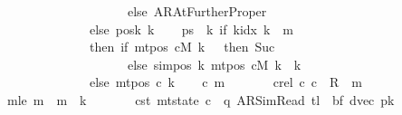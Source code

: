 \begin{isabellebody}
\ \ \ \ \ \ \ \ \ \ \ \ \ \ \ \ \ \ \ \ \ \ \ \ else\ AR{\isacharunderscore}{\kern0pt}AtFurtherProper{\isacharparenright}{\kern0pt}\isanewline
\ \ \ \ \ \ \ \ \ \ \ \ \ \ \ \ \ \ else\ posk{}\ k{\isachardoublequoteclose}\isanewline
\ \ \isamarkupfalse%
\ {\isacharquery}{\kern0pt}ps\ {\isacharequal}{\kern0pt}\ {\isachardoublequoteopen}{\isasymlambda}k{\isachardot}{\kern0pt}\ if\ k{\isacharunderscore}{\kern0pt}idx\ k\ {\isacharless}{\kern0pt}\ {\isacharquery}{\kern0pt}m{}\isanewline
\ \ \ \ \ \ \ \ \ \ \ \ \ \ \ \ \ \ then\ {\isacharparenleft}{\kern0pt}if\ mt{\isacharunderscore}{\kern0pt}pos\ cM\ k\ {\isacharequal}{\kern0pt}\ {}\ then\ Suc\ {}\isanewline
\ \ \ \ \ \ \ \ \ \ \ \ \ \ \ \ \ \ \ \ \ \ \ \ else\ sim{\isacharunderscore}{\kern0pt}pos\ {\isacharquery}{\kern0pt}k\ {\isacharparenleft}{\kern0pt}mt{\isacharunderscore}{\kern0pt}pos\ cM\ k{\isacharparenright}{\kern0pt}\ {\isacharplus}{\kern0pt}\ {\isacharquery}{\kern0pt}k{\isacharparenright}{\kern0pt}\isanewline
\ \ \ \ \ \ \ \ \ \ \ \ \ \ \ \ \ \ else\ mt{\isacharunderscore}{\kern0pt}pos\ c{}\ k{\isachardoublequoteclose}\isanewline
\ \ \isamarkupfalse%
\ c{}\ m{}\ \isanewline
\ \ \ \ \ \ c{}{\isacharunderscore}{\kern0pt}rel{\isacharcolon}{\kern0pt}\ {\isachardoublequoteopen}{\isacharparenleft}{\kern0pt}c{}{\isacharcomma}{\kern0pt}\ c{}{\isacharparenright}{\kern0pt}\ {\isasymin}\ R{\isacharprime}{\kern0pt}\ {\isacharcircum}{\kern0pt}{\isacharcircum}{\kern0pt}\ m{}{\isachardoublequoteclose}\isanewline
\ \ \ \ \ m{}{\isacharunderscore}{\kern0pt}le{\isacharcolon}{\kern0pt}\ {\isachardoublequoteopen}m{}\ {\isasymle}\ {\isacharquery}{\kern0pt}m{}\ {\isacharasterisk}{\kern0pt}\ {\isacharparenleft}{\kern0pt}{\isacharquery}{\kern0pt}k\ {\isacharplus}{\kern0pt}\ {}{\isacharparenright}{\kern0pt}{\isachardoublequoteclose}\isanewline
\ \ \ \ \ c{}{\isacharunderscore}{\kern0pt}st{\isacharcolon}{\kern0pt}\ {\isachardoublequoteopen}mt{\isacharunderscore}{\kern0pt}state\ c{}\ {\isacharequal}{\kern0pt}\ {\isacharparenleft}{\kern0pt}q{\isacharcomma}{\kern0pt}\ AR{\isacharunderscore}{\kern0pt}SimRead{\isacharcomma}{\kern0pt}\ {\isacharquery}{\kern0pt}tl{\isacharcomma}{\kern0pt}\ {}{\isacharcomma}{\kern0pt}\ {\isacharquery}{\kern0pt}bf{\isacharcomma}{\kern0pt}\ dvec{\isacharcomma}{\kern0pt}\ {\isacharquery}{\kern0pt}pk{\isacharparenright}{\kern0pt}{\isachardoublequoteclose}\isanewline

\end{isabellebody}
